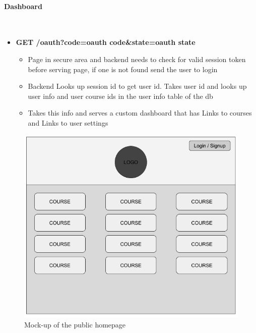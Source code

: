 \documentclass{article}
\begin{document}
\newpage

\paragraph{Dashboard}\\
\begin{itemize}
    \item \textbf{GET /oauth?code=oauth code\&state=oauth state}
        \begin{itemize}
        \item Page in secure area and backend needs to check for valid session token before serving page, if one is not found send the user to login
        \item Backend Looks up session id to get user id. Takes user id and looks up user info and user course ids in the user info table of the db
        \item Takes this info and serves a custom dashboard that has Links to courses and Links to user settings
    \end{itemize}
\end{itemize}
\begin{figure}[h]
    \caption{Mock-up of the public homepage}
    \includegraphics[width=\textwidth]{public_homepage}
\end{figure}

\newpage
\end{document}
